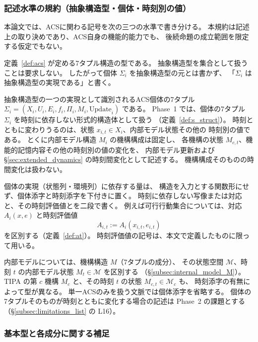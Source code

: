\subsubsection*{記述水準の規約（抽象構造型・個体・時刻別の値）}
\label{conv:structure_levels}

本論文では、ACSに関わる記号を次の三つの水準で書き分ける。
本規約は記述上の取り決めであり、ACS自身の機能的能力でも、
後続命題の成立範囲を限定する仮定でもない。

\begin{description}[style=nextline]
  \item[抽象構造型]
  定義~\ref{def:acs} が定める7タプル構造の型である。
  抽象構造型を集合として扱うことは要求しない。
  したがって個体 $\Sigma_i$ を抽象構造型の元とは書かず、
  「$\Sigma_i$ は抽象構造型の実現である」と書く。
  \item[個体 $\Sigma_i$]
  抽象構造型の一つの実現として識別されるACS個体の7タプル
  $\Sigma_i=(X_i,U_i,E_i,f_i,\Pi_i,M_i,\mathrm{Update}_i)$ である。
  Phase~1 では、個体の7タプル $\Sigma_i$ を時刻に依存しない形式的構造体として扱う
  （定義~\ref{def:s_struct}）。
  時刻とともに変わりうるのは、状態 $x_{i,t}\in X_i$、内部モデル状態その他の
  時刻別の値である。
  とくに内部モデル構造 $M_i$ の機構構成は固定し、
  各機構の状態 $M_{c,t}$、機能的記憶内容その他の時刻別の値の変化を、
  内部モデル更新および \S\ref{sec:extended_dynamics} の時刻間変化として記述する。
  機構構成そのものの時間変化は扱わない。
  \item[時刻別の値]
  個体の実現（状態列・環境列）に依存する量は、
  構造を入力とする関数形にせず、個体添字と時刻添字を下付きに置く。
  時刻に依存しない写像または対応と、その時刻評価値とを二段で書く。
  例えば可行行動集合については、対応 $A_i(x,e)$ と時刻評価値
  \[
    A_{i,t}:=A_i(x_{i,t},e_{i,t})
  \]
  を区別する（定義~\ref{def:at}）。
  時刻評価値の記号は、本文で定義したものに限って用いる。
\end{description}

内部モデルについては、機構構造 $M$（7タプルの成分）、
その状態空間 $\mathcal M$、時刻 $t$ の内部モデル状態 $M_t\in\mathcal M$ を区別する
（\S\ref{subsec:internal_model_M}）。
TIPA の第 $c$ 機構 $M_c$ と、その時刻 $t$ の状態 $M_{c,t}\in\mathcal M_c$ も、
時刻添字の有無によって型が異なる。
単一ACSのみを扱う文脈では個体添字を省略する。
個体の7タプルそのものが時刻とともに変化する場合の記述は
Phase~2 の課題とする（\S\ref{subsec:limitations_list} の L16）。

\subsubsection{基本型と各成分に関する補足}

